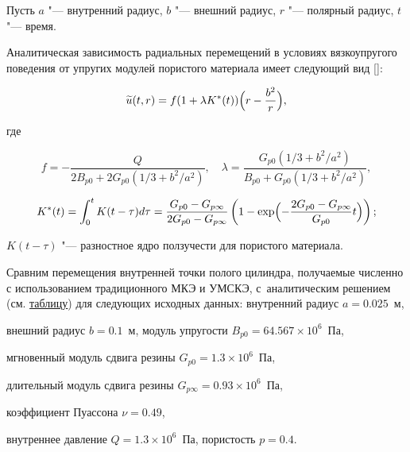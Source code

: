 Пусть $a$ "--- внутренний радиус, $b$ "--- внешний радиус, $r$ "--- полярный радиус, $t$ "--- время. 

Аналитическая зависимость радиальных перемещений в условиях вязкоупругого поведения от упругих модулей пористого материала имеет следующий вид []:

$$

\widetilde{u}(t,r)=f(1+\lambda K^{*}(t))\Bigl(r-\frac{b^2}{r}\Bigr),

$$

где

$$

f=-\frac{Q}{2B_{p0}+2G_{p0}\left({1}/{3}+{b^2}/{a^2}\right)},

\quad

\lambda=\frac{G_{p0}\left({1}/{3}+{b^2}/{a^2}\right)}{B_{p0}+G_{p0}\left({1}/{3}+{b^2}/{a^2}\right)},$$

$$K^{*}(t)=\int_{0}^{t}K(t-\tau)d\tau=\frac{G_{p0}-G_{p\infty}}{2G_{p0}-G_{p\infty}}\left(1-

\exp\Bigl(-\frac{2G_{p0}-G_{p\infty}}{G_{p0}}t\Bigr)\right);$$

$K(t-\tau)$ "--- разностное ядро ползучести для пористого материала.









Сравним перемещения внутренней точки полого цилиндра, получаемые численно с использованием традиционного МКЭ и УМСКЭ, с~аналитическим решением (см. \hyperlink{gom:table}{таблицу}) для следующих исходных данных: внутренний радиус $a=0.025$~м, 

внешний радиус $b=0.1$~м, модуль упругости $B_{p0}=64.567 \times 10^6$~Па, 

мгновенный модуль сдвига резины $G_{p0}=1.3 \times 10^6$~Па, 

длительный модуль сдвига резины $G_{p\infty}=0.93 \times 10^6$~Па, 

коэффициент Пуассона $\nu=0.49$, 

внутреннее давление $Q=1.3 \times 10^6$~Па, пористость $p=0.4$.







